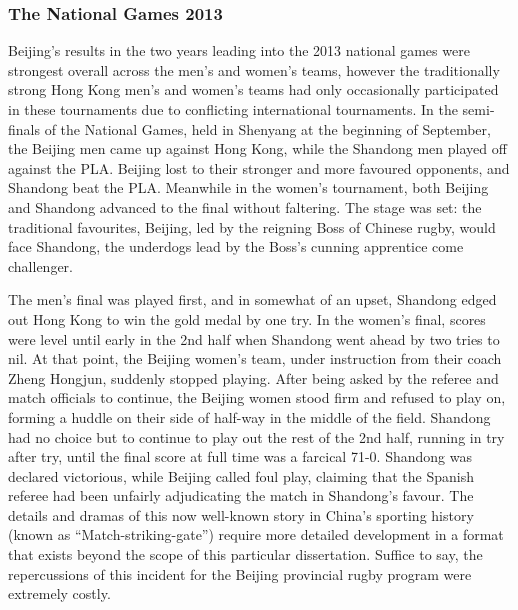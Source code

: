 {\subsubsection{The National Games 2013}
Beijing's results in the two years leading into the 2013 national games were strongest overall across the men's and women's teams, however the traditionally strong Hong Kong men's and women's teams had only occasionally participated in these tournaments due to conflicting international tournaments.  In the semi-finals of the National Games, held in Shenyang at the beginning of September, the Beijing men came up against Hong Kong, while the Shandong men played off against the PLA.  Beijing lost to their stronger and more favoured opponents, and Shandong beat the PLA.  Meanwhile in the women's tournament, both Beijing and Shandong advanced to the final without faltering.  The stage was set: the traditional favourites, Beijing, led by the reigning Boss of Chinese rugby, would face Shandong, the underdogs lead by the Boss's cunning apprentice come challenger.

The men's final was played first, and in somewhat of an upset, Shandong edged out Hong Kong to win the gold medal by one try.  In the women's final, scores were level until early in the 2nd half when Shandong went ahead by two tries to nil.  At that point, the Beijing women's team, under instruction from their coach Zheng Hongjun, suddenly stopped playing.  After being asked by the referee and match officials to continue, the Beijing women stood firm and refused to play on, forming a huddle on their side of half-way in the middle of the field. Shandong had no choice but to continue to play out the rest of the 2nd half, running in try after try, until the final score at full time was a farcical 71-0.  Shandong was declared victorious, while Beijing called foul play, claiming that the Spanish referee had been unfairly adjudicating the match in Shandong's favour.  The details and dramas of this now well-known story in China's sporting history (known as ``Match-striking-gate'') require more detailed development in a format that exists beyond the scope of this particular dissertation. Suffice to say, the repercussions of this incident for the Beijing provincial rugby program were extremely costly.




}
